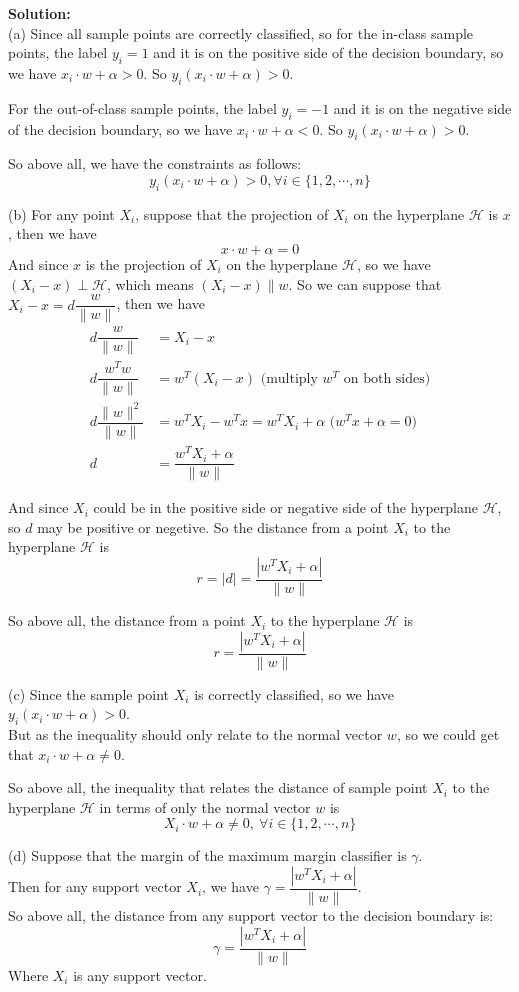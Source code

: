 \documentclass[10pt]{article}
\begin{document}
\begin{enumerate}[1.]
\textbf{Solution:}\\
(a) Since all sample points are correctly classified, so for the in-class sample points, the label $y_i=1$ and it is on the 
positive side of the decision boundary, so we have $x_i\cdot w+\alpha> 0$.
So $y_i(x_i\cdot w+\alpha)> 0$.

For the out-of-class sample points, the label $y_i=-1$ and it is on the negative side of the decision boundary, so we have $x_i\cdot w+\alpha< 0$.
So $y_i(x_i\cdot w+\alpha)> 0$.

So above all, we have the constraints as follows:
$$y_i(x_i\cdot w+\alpha)> 0, \forall i\in\{1,2,\cdots,n\}$$

(b) For any point $X_i$, suppose that the projection of $X_i$ on the hyperplane $\mathcal{H}$ is $x$, then we have
$$x\cdot w+\alpha=0$$
And since $x$ is the projection of $X_i$ on the hyperplane $\mathcal{H}$, so we have $(X_i-x)\perp \mathcal{H}$, which means
$(X_i-x) \parallel w$. So we can suppose that $X_i-x=d \dfrac{w}{\|w\|}$, then we have
\begin{align*}
  d \dfrac{w}{\|w\|}&=X_i - x \\
  d \dfrac{w^Tw}{\|w\|}&=w^T(X_i - x)  \text{ (multiply $w^T$ on both sides)} \\
  d \dfrac{\|w\|^2}{\|w\|}&=w^TX_i - w^Tx = w^TX_i + \alpha \text{ ($w^Tx+\alpha=0$)} \\
  d &= \dfrac{w^TX_i + \alpha}{\|w\|}
\end{align*}

And since $X_i$ could be in the positive side or negative side of the hyperplane $\mathcal{H}$, so $d$ may be positive or negetive.
So the distance from a point $X_i$ to the hyperplane $\mathcal{H}$ is
$$r = |d| = \dfrac{|w^TX_i + \alpha|}{\|w\|}$$

So above all, the distance from a point $X_i$ to the hyperplane $\mathcal{H}$ is
$$r = \dfrac{|w^TX_i + \alpha|}{\|w\|}$$

(c) Since the sample point $X_i$ is correctly classified, so we have $y_i(x_i\cdot w+\alpha)> 0$.\\
But as the inequality should only relate to the normal vector $w$, so we could get that $x_i\cdot w+\alpha\neq 0$.

So above all, the inequality that relates the distance of sample point $X_i$ to the hyperplane $\mathcal{H}$ in terms of only the normal vector $w$ is
$$X_i\cdot w+\alpha\neq 0,\ \forall i\in\{1,2,\cdots,n\}$$

(d) Suppose that the margin of the maximum margin classifier is $\gamma$.\\
Then for any support vector $X_i$, we have $\gamma = \dfrac{|w^TX_i + \alpha|}{\|w\|}$.\\
So above all, the distance from any support vector to the decision boundary is:
$$\gamma = \dfrac{|w^TX_i + \alpha|}{\|w\|}$$
Where $X_i$ is any support vector.\\


\end{enumerate}
\end{document}

